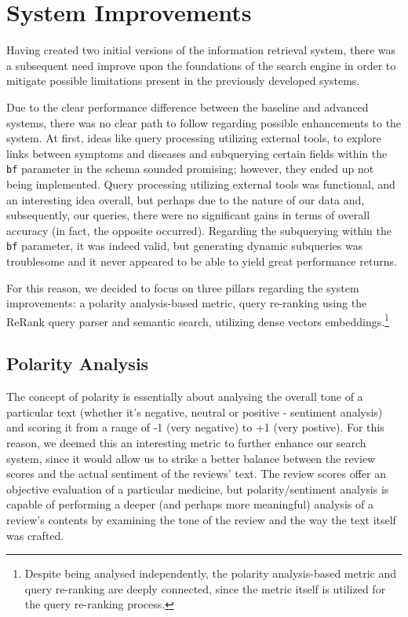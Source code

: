 \documentclass[sigconf]{acmart}
\begin{document}
\section{System Improvements}

Having created two initial versions of the information retrieval system, there was a subsequent need improve upon the foundations of the search engine in order to mitigate possible limitations present in the previously developed systems.

Due to the clear performance difference between the baseline and advanced systems, there was no clear path to follow regarding possible enhancements to the system. At first, ideas like query processing utilizing external tools, to explore links between symptoms and diseases and subquerying certain fields within the \texttt{bf} parameter in the schema sounded promising; however, they ended up not being implemented. Query processing utilizing external tools was functional, and an interesting idea overall, but perhaps due to the nature of our data and, subsequently, our queries, there were no significant gains in terms of overall accuracy (in fact, the opposite occurred). Regarding the subquerying within the \texttt{bf} parameter, it was indeed valid, but generating dynamic subqueries was troublesome and it never appeared to be able to yield great performance returns.

For this reason, we decided to focus on three pillars regarding the system improvements: a polarity analysis-based metric\cite{polarity}, query re-ranking\cite{reranking} using the ReRank\cite{rerankparser} query parser and semantic search\cite{semantic}, utilizing dense vectors embeddings\cite{embeddings}.\footnote{Despite being analysed independently, the polarity analysis-based metric and query re-ranking are deeply connected, since the metric itself is utilized for the query re-ranking process.}

\subsection{Polarity Analysis}

The concept of polarity is essentially about analysing the overall tone of a particular text (whether it's negative, neutral or positive - sentiment analysis) and scoring it from a range of -1 (very negative) to +1 (very postive). For this reason, we deemed this an interesting metric to further enhance our search system, since it would allow us to strike a better balance between the review scores and the actual sentiment of the reviews' text. The review scores offer an objective evaluation of a particular medicine, but polarity/sentiment analysis is capable of performing a deeper (and perhaps more meaningful) analysis of a review's contents by examining the tone of the review and the way the text itself was crafted.
\end{document}
